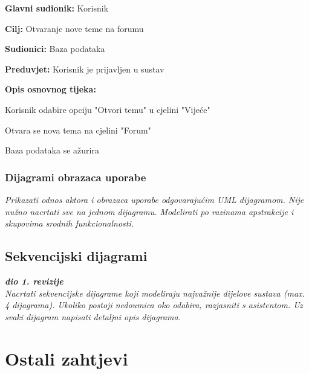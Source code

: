 					\begin{packed_item}
	
						\item \textbf{Glavni sudionik: }Korisnik
						\item  \textbf{Cilj:} Otvaranje nove teme na forumu
						\item  \textbf{Sudionici:} Baza podataka
						\item  \textbf{Preduvjet:} Korisnik je prijavljen u  sustav
						\item  \textbf{Opis osnovnog tijeka:}
						
						\item[] \begin{packed_enum}
	
							\item Korisnik odabire opciju "Otvori temu" u cjelini "Vijeće" 
							\item Otvara se nova tema na cjelini "Forum"
							\item Baza podataka se ažurira
							
						\end{packed_enum}				
						
					\end{packed_item}
						
				\subsubsection{Dijagrami obrazaca uporabe}
					
					\textit{Prikazati odnos aktora i obrazaca uporabe odgovarajućim UML dijagramom. Nije nužno nacrtati sve na jednom dijagramu. Modelirati po razinama apstrakcije i skupovima srodnih funkcionalnosti.}
				\eject		
				
			\subsection{Sekvencijski dijagrami}
				
				\textbf{\textit{dio 1. revizije}}\\
				
				\textit{Nacrtati sekvencijske dijagrame koji modeliraju najvažnije dijelove sustava (max. 4 dijagrama). Ukoliko postoji nedoumica oko odabira, razjasniti s asistentom. Uz svaki dijagram napisati detaljni opis dijagrama.}
				\eject
	
		\section{Ostali zahtjevi}
		
